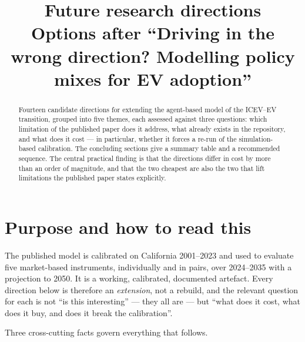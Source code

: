 \documentclass[11pt]{article}
\title{Future research directions\\
\large Options after ``Driving in the wrong direction? Modelling policy
mixes for EV adoption''}
\author{}
\date{}
\begin{document}
\maketitle

\begin{abstract}
\noindent
Fourteen candidate directions for extending the agent-based model of the
ICEV--EV transition, grouped into five themes, each assessed against three
questions: which limitation of the published paper does it address, what
already exists in the repository, and what does it cost --- in particular,
whether it forces a re-run of the simulation-based calibration. The
concluding sections give a summary table and a recommended sequence. The
central practical finding is that the directions differ in cost by more than
an order of magnitude, and that the two cheapest are also the two that lift
limitations the published paper states explicitly.
\end{abstract}

\tableofcontents

\section{Purpose and how to read this}

The published model is calibrated on California 2001--2023 and used to
evaluate five market-based instruments, individually and in pairs, over
2024--2035 with a projection to 2050. It is a working, calibrated,
documented artefact. Every direction below is therefore an
\emph{extension}, not a rebuild, and the relevant question for each is not
``is this interesting'' --- they all are --- but ``what does it cost, what
does it buy, and does it break the calibration''.

Three cross-cutting facts govern everything that follows.
\end{document}
